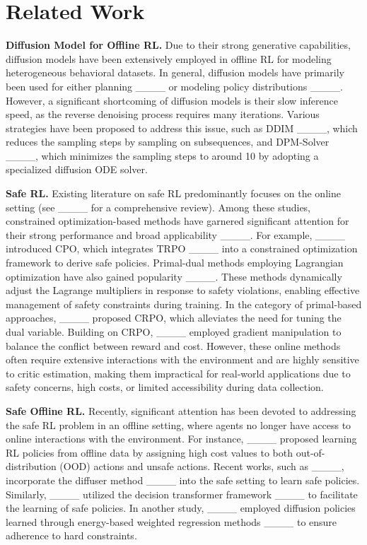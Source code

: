 \section{Related Work}
\textbf{Diffusion Model for Offline RL.} Due to their strong generative capabilities, diffusion models have been extensively employed in offline RL for modeling heterogeneous behavioral datasets. In general, diffusion models have primarily been used for either planning ____ or modeling policy distributions ____. However, a significant shortcoming of diffusion models is their slow inference speed, as the reverse denoising process requires many iterations. Various strategies have been proposed to address this issue, such as DDIM ____, which reduces the sampling steps by sampling on subsequences, and DPM-Solver ____, which minimizes the sampling steps to around 10 by adopting a specialized diffusion ODE solver.


\textbf{Safe RL.} 
Existing literature on safe RL predominantly focuses on the online setting (see ____ for a comprehensive review).
Among these studies, constrained optimization-based methods have garnered significant attention for their strong performance and broad applicability ____.
For example, ____ introduced CPO, which integrates TRPO ____ into a constrained optimization framework to derive safe policies.
Primal-dual methods employing Lagrangian optimization have also gained popularity ____.
These methods dynamically adjust the Lagrange multipliers in response to safety violations, enabling effective management of safety constraints during training.
In the category of primal-based approaches, ____ proposed CRPO, which alleviates the need for tuning the dual variable.
Building on CRPO, ____ employed gradient manipulation to balance the conflict between reward and cost.
However, these online methods often require extensive interactions with the environment and are highly sensitive to critic estimation, making them impractical for real-world applications due to safety concerns, high costs, or limited accessibility
during data collection.





\textbf{Safe Offline RL.} Recently, significant attention has been devoted to addressing the safe RL problem in an offline setting, where agents no longer have access to online interactions with the environment. For instance, ____ proposed learning RL policies from offline data by assigning high cost values to both out-of-distribution (OOD) actions and unsafe actions. Recent works, such as ____, incorporate the diffuser method ____ into the safe setting to learn safe policies. Similarly, ____ utilized the decision transformer framework ____ to facilitate the learning of safe policies. In another study, ____ employed diffusion policies learned through energy-based weighted regression methods ____ to ensure adherence to hard constraints.